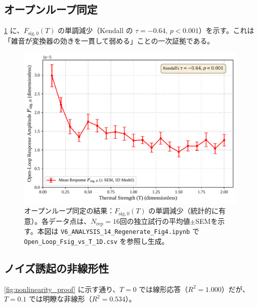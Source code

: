 \documentclass[a4paper,11pt,ja=standard,lualatex]{bxjsarticle}
\newcommand{\figref}[1]{\cref{#1}}
\begin{document}
\subsection{オープンループ同定}
\figref{fig:open_loop_response} に、$F_{\mathrm{sig},0}(T)$ の単調減少（Kendall の $\tau=-0.64$, $p<0.001$）を示す。これは「雑音が変換器の効きを一貫して弱める」ことの一次証拠である。

\begin{figure}[H]
\centering
\includegraphics[width=0.8\linewidth]{fig3_open_loop_response_corrected.pdf}
\caption{オープンループ同定の結果：$F_{\mathrm{sig},0}(T)$ の単調減少（統計的に有意）。各データ点は、$N_{\mathrm{rep}}=16$回の独立試行の平均値$\pm$SEMを示す。本図は \texttt{V6\_ANALYSIS\_14\_Regenerate\_Fig4.ipynb} で \texttt{Open\_Loop\_Fsig\_vs\_T\_1D.csv} を参照し生成。}
\label{fig:open_loop_response}
\end{figure}

\FloatBarrier

\subsection{ノイズ誘起の非線形性}
\figref{fig:nonlinearity_proof} に示す通り、$T=0$ では線形応答（$R^2=1.000$）だが、$T=0.1$ では明瞭な非線形（$R^2=0.534$）。
\end{document}
